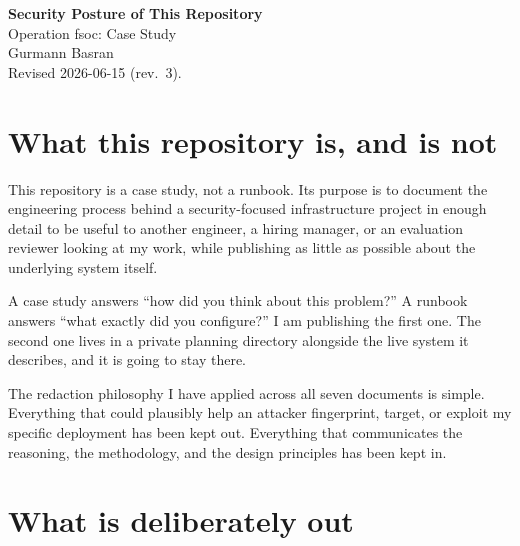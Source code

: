 \documentclass[12pt]{article}
\begin{document}
\begin{center}
{\LARGE\textbf{Security Posture of This Repository}}\\[4pt]
{\large Operation fsoc: Case Study}\\[6pt]
Gurmann Basran\\
\small Revised 2026-06-15 (rev.\ 3).
\end{center}

\section{What this repository is, and is not}

This repository is a case study, not a runbook. Its purpose is to document the engineering process behind a security-focused infrastructure project in enough detail to be useful to another engineer, a hiring manager, or an evaluation reviewer looking at my work, while publishing as little as possible about the underlying system itself.

A case study answers ``how did you think about this problem?'' A runbook answers ``what exactly did you configure?'' I am publishing the first one. The second one lives in a private planning directory alongside the live system it describes, and it is going to stay there.

The redaction philosophy I have applied across all seven documents is simple. Everything that could plausibly help an attacker fingerprint, target, or exploit my specific deployment has been kept out. Everything that communicates the reasoning, the methodology, and the design principles has been kept in.

\section{What is deliberately out}
\end{document}
